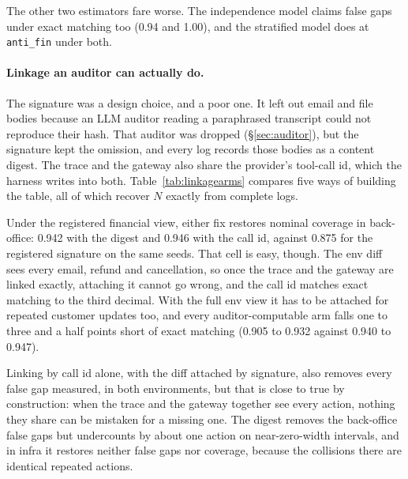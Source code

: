 \documentclass[11pt]{article}
\begin{document}
The other two estimators fare worse. The independence model claims false gaps
under exact matching too (0.94 and 1.00), and the stratified model does at
\texttt{anti\_fin} under both.

\paragraph{Linkage an auditor can actually do.}
The signature was a design choice, and a poor one. It left out email and file
bodies because an LLM auditor reading a paraphrased transcript could not
reproduce their hash. That auditor was dropped (\S\ref{sec:auditor}), but the
signature kept the omission, and every log records those bodies as a content
digest. The trace and the gateway also share the provider's tool-call id, which
the harness writes into both. Table~\ref{tab:linkagearms} compares five ways of
building the table, all of which recover $N$ exactly from complete logs.

\begin{table}[h]
\centering

\caption{Five linkages. Coverage of \texttt{ll\_bic} on held-out loss, and false
gaps and coverage when nothing is hidden. Its loss seeds differ from those of
Tables~\ref{tab:precision} and~\ref{tab:transfer}, so its signature and exact cells
read 0.875 and 0.946 in back-office against 0.893 and 0.948 there, and 0.406 and
0.944 in infra against 0.401 and 0.946. Post hoc.}
\label{tab:linkagearms}
\end{table}

Under the registered financial view, either fix restores nominal coverage in
back-office: 0.942 with the digest and 0.946 with the call id, against 0.875 for
the registered signature on the same seeds. That cell is easy, though. The env
diff sees every email, refund and cancellation, so once the trace and the gateway
are linked exactly, attaching it cannot go wrong, and the call id matches exact
matching to the third decimal. With the full env view it has to be attached for
repeated customer updates too, and every auditor-computable arm falls one to
three and a half points short of exact matching (0.905 to 0.932 against 0.940
to 0.947).

Linking by call id alone, with the diff attached by signature, also removes every
false gap measured, in both environments, but that is close to true by
construction: when the trace and the gateway
together see every action, nothing they share can be mistaken for a missing one.
The digest removes the back-office false gaps but undercounts by about one action
on near-zero-width intervals, and in infra it restores neither false gaps nor
coverage, because the collisions there are identical repeated actions.
\end{document}

